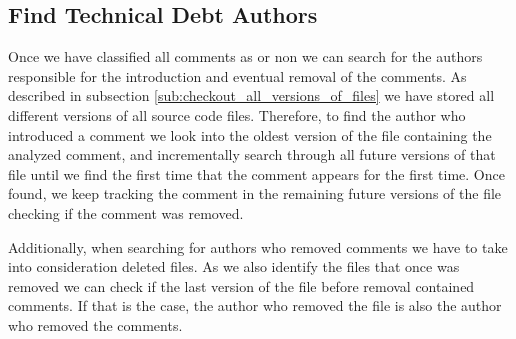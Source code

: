 \subsection*{Find Technical Debt Authors}
\label{sub:find_technical_debt_authors}

Once we have classified all comments as \SATD or non \SATD we can search for the authors responsible for the introduction and eventual removal of the \SATD comments. As described in subsection \ref{sub:checkout_all_versions_of_files} we have stored all different versions of all source code files. Therefore, to find the author who introduced a \SATD comment we look into the oldest version of the file containing the analyzed comment, and incrementally search through all future versions of that file until we find the first time that the comment appears for the first time. Once found, we keep tracking the \SATD comment in the remaining future versions of the file checking if  the \SATD comment was removed. 

Additionally, when searching for authors who removed \SATD comments we have to take into consideration deleted files. As we also identify the files that once was removed we can check if the last version of the file before removal contained \SATD comments. If that is the case, the author who removed the file is also the author who removed the \SATD comments. 
